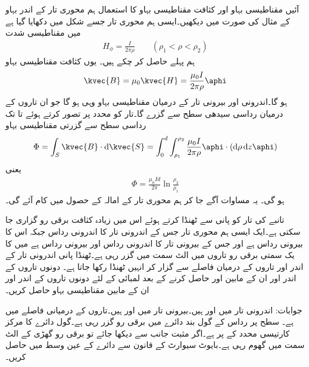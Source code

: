 آئیں مقناطیسی بہاو اور کثافت مقناطیسی بہاو کا استعمال ہم محوری تار کے اندر بہاو کے مثال کی صورت میں دیکھیں۔ایسی ہم محوری تار جسے شکل  میں دکھایا گیا ہے میں مقناطیسی شدت
\begin{align*}
H_{\phi}=\frac{I}{2\pi \rho} \quad \quad (\rho_1 < \rho < \rho_2)
\end{align*}
ہم پہلے حاصل کر چکے ہیں۔ یوں کثافت مقناطیسی بہاو
\begin{align*}
\kvec{B}=\mu_0 \kvec{H}=\frac{\mu_0 I}{2\pi \rho} \aphi
\end{align*}
ہو گا۔اندرونی اور بیرونی تار کے درمیان مقناطیسی بہاو وہی ہو گا جو ان تاروں کے درمیان رداسی سیدھی سطح سے گزرے گا۔تار کو  محدد پر تصور کرتے ہوئے  تا  تک رداسی سطح سے گزرتی مقناطیسی بہاو
\begin{align*}
\Phi=\int_S \kvec{B} \cdot \dif \kvec{S}=\int_{0}^{d} \int_{\rho_1}^{\rho_2} \frac{\mu_0 I}{2\pi \rho} \aphi \cdot (\dif \rho \dif z \aphi)
\end{align*}
یعنی
\begin{align}
\Phi=\frac{\mu_0 I d}{2\pi} \ln \frac{\rho_2}{\rho_1}
\end{align}
ہو گی۔ یہ مساوات آگے جا کر ہم محوری تار کے امالہ کے حصول میں کام آئے گی۔

تانبے کی تار کو پانی سے ٹھنڈا کرتے ہوئے اس میں زیادہ کثافت برقی رو گزاری جا سکتی ہے۔ایک ایسی ہم محوری تار جس کے اندرونی تار کا اندرونی رداس  جبکہ اس کا بیرونی رداس  ہے اور جس کے بیرونی تار کا اندرونی رداس  اور بیرونی رداس  ہے میں  کا یک سمتی برقی رو تاروں میں الٹ سمت میں گزر رہی ہے۔ٹھنڈا پانی اندرونی تار کے اندر اور تاروں کے درمیان فاصلے سے گزار کر انہیں ٹھنڈا رکھا جاتا ہے۔ دونوں تاروں کے اندر اور ان کے مابین  اور  حاصل کرنے کے بعد   لمبائی کے  لئے  دونوں تاروں کے اندر اور ان کے مابین  مقناطیسی بہاو حاصل کریں۔

جوابات: اندرونی تار میں  اور  ہیں۔بیرونی تار میں  اور  ہیں۔تاروں کے درمیانی فاصلے میں  ہے۔
 سطح پر  رداس کے گول بند دائرے میں  برقی رو گزر رہی ہے۔گول دائرے کا مرکز کارتیسی محدد کے  پر ہے۔اگر مثبت  جانب  سے دیکھا جائے تو برقی رو گھڑی کے الٹ سمت میں گھوم رہی ہے۔بایوٹ سیوارٹ کے قانون سے دائرے کے عین وسط میں  حاصل کریں۔


